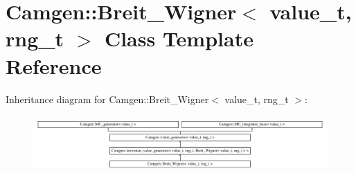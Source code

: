 \hypertarget{a00027}{}\section{Camgen\+:\+:Breit\+\_\+\+Wigner$<$ value\+\_\+t, rng\+\_\+t $>$ Class Template Reference}
\label{a00027}
Inheritance diagram for Camgen\+:\+:Breit\+\_\+\+Wigner$<$ value\+\_\+t, rng\+\_\+t $>$\+:\begin{figure}[H]
\begin{center}
\leavevmode
\includegraphics[height=2.187500cm]{a00027}
\end{center}
\end{figure}
